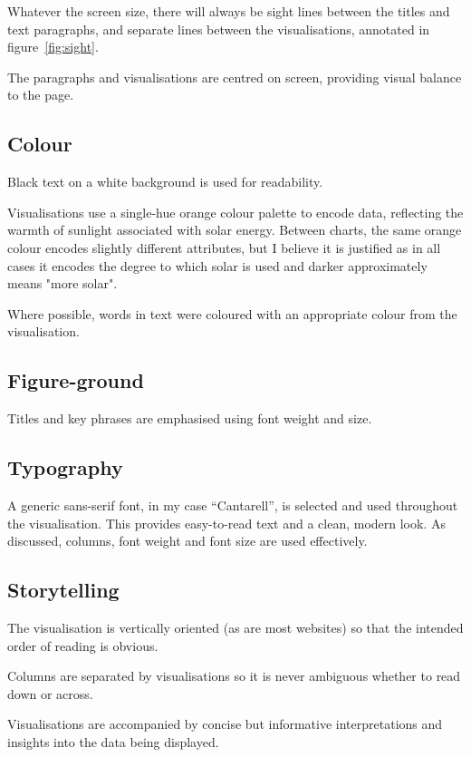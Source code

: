 \documentclass[12pt,letterpaper]{article}
\begin{document}
\begin{multicols}{2}
    Whatever the screen size, there will always be sight lines between the titles and text paragraphs, and separate lines between the visualisations, annotated in figure~\ref{fig:sight}.

    The paragraphs and visualisations are centred on screen, providing visual balance to the page.

    \subsection*{Colour}

    Black text on a white background is used for readability.

    Visualisations use a single-hue orange colour palette to encode data, reflecting the warmth of sunlight associated with solar energy. Between charts, the same orange colour encodes slightly different attributes, but I believe it is justified as in all cases it encodes the degree to which solar is used and darker approximately means "more solar".

    Where possible, words in text were coloured with an appropriate colour from the visualisation.

    \subsection*{Figure-ground}

    Titles and key phrases are emphasised using font weight and size.

    \subsection*{Typography}

    A generic sans-serif font, in my case ``Cantarell'', is selected and used throughout the visualisation. This provides easy-to-read text and a clean, modern look. As discussed, columns, font weight and font size are used effectively.

    \subsection*{Storytelling}

    The visualisation is vertically oriented (as are most websites) so that the intended order of reading is obvious.

    Columns are separated by visualisations so it is never ambiguous whether to read down or across.

    Visualisations are accompanied by concise but informative interpretations and insights into the data being displayed.

    {}

\end{multicols}
\end{document}
